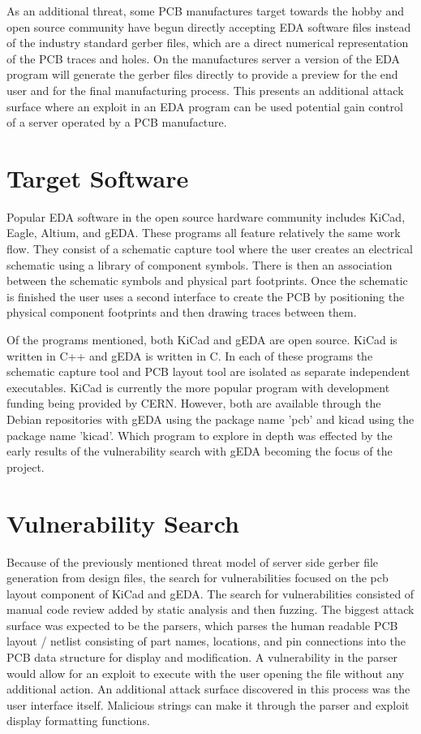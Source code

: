 \documentclass[12pt]{article}
\begin{document}
As an additional threat, some PCB manufactures target towards the hobby and open source community have begun directly accepting EDA software files instead of the industry standard gerber files, which are a direct numerical representation of the PCB traces and holes. On the manufactures server a version of the EDA program will generate the gerber files directly to provide a preview for the end user and for the final manufacturing process. This presents an additional attack surface where an exploit in an EDA program can be used potential gain control of a server operated by a PCB manufacture. 


\section{Target Software}
\label{S:3}
Popular EDA software in the open source hardware community includes KiCad, Eagle, Altium, and gEDA. These programs all feature relatively the same work flow. They consist of a schematic capture tool where the user creates an electrical schematic using a library of component symbols. There is then an association between the schematic symbols and physical part footprints. Once the schematic is finished the user uses a second interface to create the PCB by positioning the physical component footprints and then drawing traces between them. 

Of the programs mentioned, both KiCad and gEDA are open source. KiCad is written in C++ and gEDA is written in C. In each of these programs the schematic capture tool and PCB layout tool are isolated as separate independent executables. KiCad is currently the more popular program with development funding being provided by CERN. However, both are available through the Debian repositories with gEDA using the package name 'pcb' and kicad using the package name 'kicad'. Which program to explore in depth was effected by the early results of the vulnerability search with gEDA becoming the focus of the project. 


\section{Vulnerability Search}
\label{S:3}
Because of the previously mentioned threat model of server side gerber file generation from design files, the search for vulnerabilities focused on the pcb layout component of KiCad and gEDA. The search for vulnerabilities consisted of manual code review added by static analysis and then fuzzing. The biggest attack surface was expected to be the parsers, which parses the human readable PCB layout / netlist consisting of part names, locations, and pin connections into the PCB data structure for display and modification. A vulnerability in the parser would allow for an exploit to execute with the user opening the file without any additional action. An additional attack surface discovered in this process was the user interface itself. Malicious strings can make it through the parser and exploit display formatting functions. 
\end{document}
